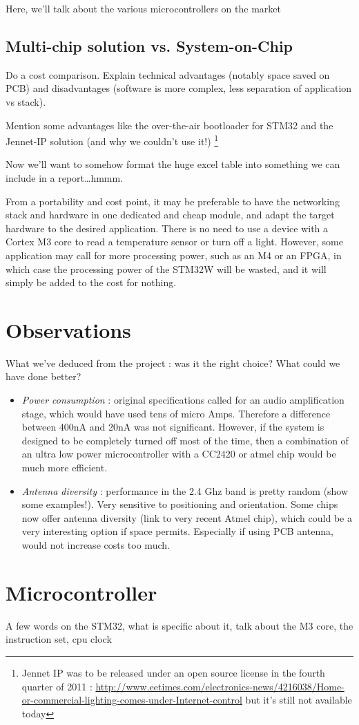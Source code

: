 Here, we'll talk about the various microcontrollers on the market

\subsection{Multi-chip solution vs. System-on-Chip}

Do a cost comparison. 
Explain technical advantages (notably space saved on PCB) and disadvantages
(software is more complex, less separation of application vs stack).

Mention some advantages like the over-the-air bootloader for STM32 and the
Jennet-IP solution (and why we couldn't use it!) \footnote{Jennet IP was to be
released under an open source license in the fourth quarter of 2011
: \url{http://www.eetimes.com/electronics-news/4216038/Home-or-commercial-lighting-comes-under-Internet-control}
but it's still not available today}

Now we'll want to somehow format the huge excel table into something we can
include in a report\ldots hmmm.


From a portability and cost point, it may be preferable to have the networking
stack and hardware in one dedicated and cheap module, and adapt the target
hardware to the desired application. There is no need to use a device with
a Cortex M3 core to read a temperature sensor or turn off a light. However, some
application may call for more processing power, such as an M4 or an FPGA, in
which case the processing power of the STM32W will be wasted, and it will simply
be added to the cost for nothing.

\section{Observations}

What we've deduced from the project : was it the right choice? What could we
have done better?

\begin{itemize}
  \item \emph{Power consumption} : original specifications called for an audio
    amplification stage, which would have used tens of micro Amps.
    Therefore a difference between 400nA and 20nA was not significant. However,
    if the system is designed to be completely turned off most of the time, then
    a combination of an ultra low power microcontroller with a CC2420 or atmel
    chip would be much more efficient.
  \item \emph{Antenna diversity} : performance in the 2.4 Ghz band is pretty
    random (show some examples!). Very sensitive to positioning and orientation.
    Some chips now offer antenna diversity (link to very recent Atmel chip),
    which could be a very interesting option if space permits. Especially if
    using PCB antenna, would not increase costs too much.
\end{itemize}


\section{Microcontroller}

A few words on the STM32, what is specific about it, talk about the M3 core, the
instruction set, cpu clock
